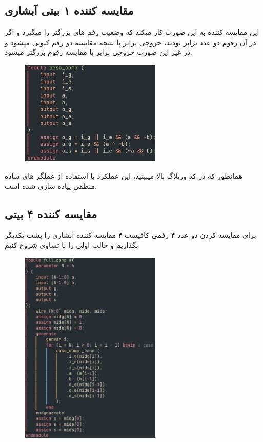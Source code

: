 \documentclass{article}
\begin{document}
\subsection{مقایسه کننده ۱ بیتی آبشاری}

این مقایسه کننده به این صورت کار میکند که وضعیت رقم های بزرگتر را میگیرد
و اگر در آن رقوم دو عدد برابر بودند، خروجی برابر با نتیجه مقایسه دو رقم 
کنونی میشود و در غیر این صورت خروجی برابر با مقایسه رقوم بزرگتر میشود.

\begin{figure}[H]
    \centering
    \includegraphics[width=0.6\textwidth]{./casc_comp.png}
\end{figure}
همانطور که در کد وریلاگ بالا میبینید، این عملکرد با استفاده از عملگر های
ساده منطقی پیاده سازی شده است.

\subsection{مقایسه کننده ۴ بیتی}

برای مقایسه کردن دو عدد ۴ رقمی کافیست ۴ مقایسه کننده آبشاری را پشت یکدیگر
بگذاریم و حالت اولی را با تساوی شروع کنیم.

\begin{figure}[H]
    \centering
    \includegraphics[width=0.6\textwidth]{./full_comp.png}
\end{figure}
\end{document}
